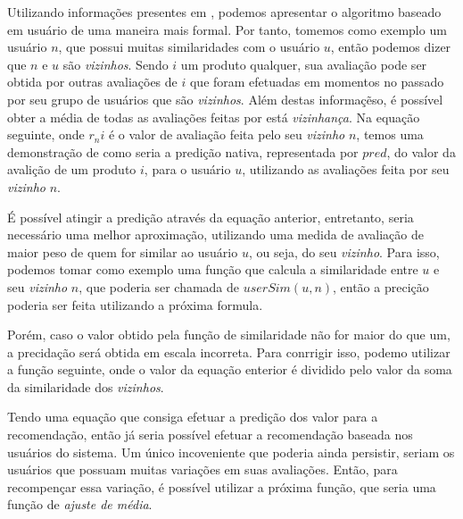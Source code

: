 \documentclass[12pt,
				openright,
				twoside,
				a4paper,
				apter=TITLE,
				section=TITLE,
				subsection=TITLE,
				chapter=TITLE,
				english,
				french,
				spanish,
				brazil]{abntex2}
\begin{document}
Utilizando informações presentes em \cite{schafer2007collaborative}, podemos apresentar o algoritmo baseado em usuário de uma maneira mais formal. Por tanto, tomemos como exemplo um usuário $n$, que possui muitas similaridades com o usuário $u$, então podemos dizer que $n$ e $u$ são \textit{vizinhos}. Sendo $i$ um produto qualquer, sua avaliação pode ser obtida por outras avaliações de $i$ que foram efetuadas em momentos no passado por seu grupo de usuários que são \textit{vizinhos}. Além destas informaçẽso, é possível obter a média de todas as avaliações feitas por está \textit{vizinhança}. Na equação seguinte, onde $r_ni$ é o valor de avaliação feita pelo seu \textit{vizinho} $n$, temos uma demonstração de como seria a predição nativa, representada por $pred$, do valor da avalição de um produto $i$, para o usuário $u$, utilizando as avaliações feita por seu \textit{vizinho} $n$.


É possível atingir a predição através da equação anterior, entretanto, seria necessário uma melhor aproximação, utilizando uma medida de avaliação de maior peso de quem for similar ao usuário $u$, ou seja, do seu \textit{vizinho}. Para isso, podemos tomar como exemplo uma função que calcula a similaridade entre $u$ e seu \textit{vizinho} $n$, que poderia ser chamada de $userSim(u,n)$, então a precição poderia ser feita utilizando a próxima formula. 


Porém, caso o valor obtido pela função de similaridade não for maior do que um, a precidação será obtida em escala incorreta. Para conrrigir isso, podemo utilizar a função seguinte, onde o valor da equação enterior é dividido pelo valor da soma da similaridade dos \textit{vizinhos}.


Tendo uma equação que consiga efetuar a predição dos valor para a recomendação, então já seria possível efetuar a recomendação baseada nos usuários do sistema. Um único incoveniente que poderia ainda persistir, seriam os usuários que possuam muitas variações em suas avaliações. Então, para recompençar essa variação, é possível utilizar a próxima função, que seria uma função de \textit{ajuste de média}.

\end{document}
